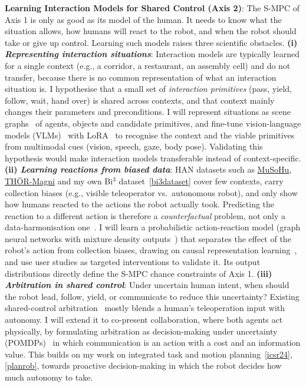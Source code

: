 \documentclass[11pt]{article}
\begin{document}
\vspace{0.5ex}
\noindent \textbf{{Learning Interaction Models for Shared Control (Axis 2)}}: The S-MPC of Axis 1 is only as good as its model of the human. It needs to know what the situation allows, how humans will react to the robot, and when the robot should take or give up control. Learning such models raises three scientific obstacles. \textbf{(i) \textit{Representing interaction situations}}: Interaction models are typically learned for a single context (e.g., a corridor, a restaurant, an assembly cell) and do not transfer, because there is no common representation of what an interaction situation is. I hypothesise that a small set of \textit{interaction primitives} (pass, yield, follow, wait, hand over) is shared across contexts, and that context mainly changes their parameters and preconditions. I will represent situations as scene graphs~\cite{chang2021comprehensive} of agents, objects and candidate primitives, and fine-tune vision-language models (VLMs)~\cite{zhang2024vision} with LoRA~\cite{hu2022lora, luo2025towards} to recognise the context and the viable primitives from multimodal cues (vision, speech, gaze, body pose). Validating this hypothesis would make interaction models transferable instead of context-specific. \textbf{(ii) \textit{Learning reactions from biased data}}: HAN datasets such as \href{https://github.com/RobotiXX/MuSoHu-data-collection}{MuSoHu}, \href{http://thor.oru.se/magni.html}{THÖR-Magni} and my own Bi$^3$ dataset~\ref{bi3dataset} cover few contexts, carry collection biases (e.g., visible teleoperator vs.\ autonomous robot), and only show how humans reacted to the actions the robot actually took. Predicting the reaction to a different action is therefore a \textit{counterfactual} problem, not only a data-harmonisation one~\cite{loulaki2024addressing}. I will learn a probabilistic action-reaction model (graph neural networks with mixture density outputs~\cite{errica2021graph}) that separates the effect of the robot's action from collection biases, drawing on causal representation learning~\cite{scholkopf2021toward}, and use user studies as targeted interventions to validate it. Its output distributions directly define the S-MPC chance constraints of Axis 1. \textbf{(iii) \textit{Arbitration in shared control}}: Under uncertain human intent, when should the robot lead, follow, yield, or communicate to reduce this uncertainty? Existing shared-control arbitration~\cite{dragan2013policy} mostly blends a human's teleoperation input with autonomy. I will extend it to co-present collaboration, where both agents act physically, by formulating arbitration as decision-making under uncertainty (POMDPs)~\cite{rizk2018decision} in which communication is an action with a cost and an information value. This builds on my work on integrated task and motion planning~\ref{icsr24}, \ref{planrob}, towards proactive decision-making in which the robot decides how much autonomy to take.
\end{document}
